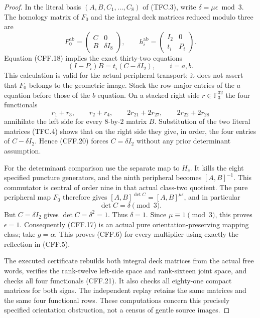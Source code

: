 \begin{proof}
In the literal basis $(A,B,C_1,\ldots,C_8)$ of (TFC.3), write
$\delta=\mu\epsilon\bmod3$.  The homology matrix of $F_0$ and
the integral deck matrices reduced modulo three are
\[
 F_0^{\mathrm{ab}}=
       \begin{pmatrix}C&0\\ B&\delta I_8\end{pmatrix},
 \qquad
 h_i^{\mathrm{ab}}=
       \begin{pmatrix}I_2&0\\ t_i&P_i\end{pmatrix}.
                                                               \tag{CFF.19}
\]
Equation (CFF.18) implies the exact thirty-two equations
\[
              (I-P_i)B=t_i(C-\delta I_2),\qquad i=a,b.
                                                               \tag{CFF.20}
\]
This calculation is valid for the actual peripheral transport;
it does not assert that $F_0$ belongs to the geometric image.
Stack the row-major entries of the $a$ equation before those
of the $b$ equation.  On a stacked right side $r\in\mathbb F_3^{32}$
the four functionals
\[
 r_1+r_3,\qquad r_2+r_4,\qquad
                 2r_{21}+2r_{27},\qquad2r_{22}+2r_{28}
                                                               \tag{CFF.21}
\]
annihilate the left side for every $8$-by-$2$ matrix $B$.
Substitution of the two literal matrices (TFC.4) shows that on
the right side they give, in order, the four entries of
$C-\delta I_2$.  Hence (CFF.20) forces $C=\delta I_2$
without any prior determinant assumption.

For the determinant comparison use the separate map to $H_c$.
It kills the eight specified puncture generators, and the
ninth peripheral becomes $[A,B]^{-1}$.  This commutator is
central of order nine in that actual class-two quotient.
The pure peripheral map $F_0$ therefore gives
$[A,B]^{\det C}=[A,B]^{\mu\epsilon}$, and in particular
\[
                     \det C=\delta\pmod3.
                                                               \tag{CFF.22}
\]
But $C=\delta I_2$ gives $\det C=\delta^2=1$.
Thus $\delta=1$.  Since $\mu\equiv1\pmod3$, this proves
$\epsilon=1$.  Consequently (CFF.17) is an actual pure
orientation-preserving mapping class; take $g=\alpha$.
This proves (CFF.6) for every multiplier using exactly the
reflection in (CFF.5).

The executed certificate
rebuilds both integral deck matrices from the actual free
words, verifies the rank-twelve left-side space and rank-sixteen
joint space, and checks all four functionals (CFF.21).
It also checks all eighty-one compact matrices for both signs.
The independent replay retains the same matrices and the
same four functional rows.  These computations concern this
precisely specified orientation obstruction, not a census of
gentle source images.


\end{proof}
